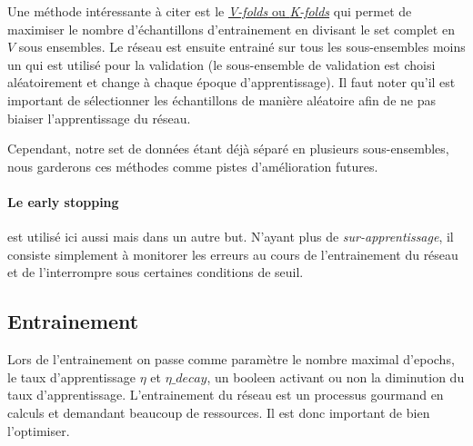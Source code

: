 \documentclass[11pt]{article}
\begin{document}
Une m\'ethode int\'eressante \`a citer est le \href{http://work.caltech.edu/slides/slides13.pdf}
{\emph{V-folds} ou \emph{K-folds}} qui permet de maximiser le nombre d'\'echantillons
d'entrainement en divisant le set complet en $V$ sous ensembles. Le r\'eseau est
ensuite entrain\'e sur tous les sous-ensembles moins un qui est utilis\'e pour la
validation (le sous-ensemble de validation est choisi al\'eatoirement et change
\`a chaque \'epoque d'apprentissage). Il faut noter qu'il est important de
s\'electionner les \'echantillons de mani\`ere al\'eatoire afin de ne pas biaiser
l'apprentissage du r\'eseau.

Cependant, notre set de donn\'ees \'etant d\'ej\`a s\'epar\'e en plusieurs sous-ensembles,
nous garderons ces m\'ethodes comme pistes d'am\'elioration futures.

\paragraph{Le early stopping} est utilis\'e ici aussi mais dans un autre but.
N'ayant plus de {\em sur-apprentissage}, il consiste simplement \`a monitorer
les erreurs au cours de l'entrainement du r\'eseau et
de l'interrompre sous certaines conditions de seuil.

\newpage
\subsection{Entrainement}
Lors de l'entrainement on passe comme param\`etre le nombre maximal d'epochs,
le taux d'apprentissage $\eta$ et $\eta\_decay$, un booleen activant ou non la
diminution du taux d'apprentissage.
L'entrainement du r\'eseau est un processus gourmand en calculs et demandant
beaucoup de ressources. Il est donc important de bien l'optimiser.
\end{document}
